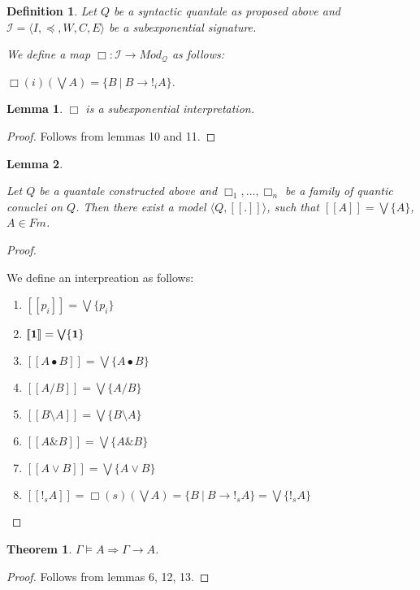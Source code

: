 \documentclass[a4paper]{article}
\newtheorem{theorem}{Theorem}
\newtheorem{lemma}{Lemma}
\newtheorem{defin}{Definition}
\begin{document}
\begin{defin} Let $Q$ be a syntactic quantale as proposed above and
  $\mathcal{I} = \langle I, \preceq, W, C, E \rangle$ be a subexponential signature.

  We define a map $\Box : \mathcal{I} \to Mod_{\mathcal{Q}}$ as follows:

  $\Box(i)(\bigvee A) = \{ B \: | \: B \rightarrow !_i A \}$.
\end{defin}

\begin{lemma} $\Box$ is a subexponential interpretation.
\end{lemma}

\begin{proof}
  Follows from lemmas 10 and 11.
\end{proof}

\begin{lemma}
$ $

  Let $Q$ be a quantale constructed above and $\Box_1, \dots, \Box_n$ be a family of quantic conuclei on $Q$.
  Then there exist a model $\langle Q, [\![.]\!]\rangle$, such that $[\![A]\!] = \bigvee \{ A \}$, $A \in Fm$.
\end{lemma}

\begin{proof}
$ $

  We define an interpreation as follows:

\begin{enumerate}
  \item $[\![p_i]\!] = \bigvee \{ p_i \}$
  \item $[\![{\bf 1}]\!] = \bigvee \{ {\bf 1} \}$
  \item $[\![A \bullet B]\!] = \bigvee \{ A \bullet B \}$
  \item $[\![A / B]\!] = \bigvee \{ A / B \}$
  \item $[\![B \setminus A]\!] = \bigvee \{ B \setminus A \}$
  \item $[\![A \& B ]\!] = \bigvee \{ A \& B \}$
  \item $[\![A \lor B]\!] = \bigvee \{ A \lor B\}$
  \item $[\![!_s A]\!] = \Box(s) (\bigvee A) = \{ B \: | \: B \rightarrow !_s A \} = \bigvee \{ !_s A \}$
\end{enumerate}
\end{proof}

\begin{theorem}
  $\Gamma \models A \Rightarrow \Gamma \rightarrow A$.
\end{theorem}

\begin{proof}
  Follows from lemmas 6, 12, 13.
\end{proof}
\end{document}
